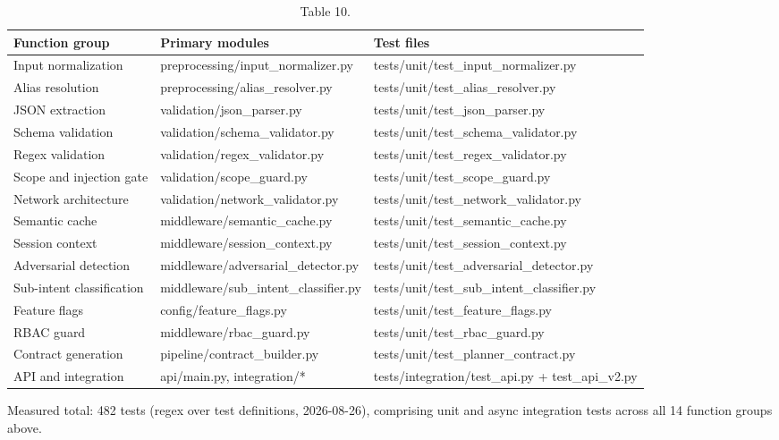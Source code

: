 \documentclass[10pt,journal,onecolumn]{IEEEtran}
\begin{document}
\begin{table}[h]
\caption{Table 10.}
\label{tab:t10}
\begin{tabularx}{\columnwidth}{l >{\raggedright\arraybackslash}X >{\raggedright\arraybackslash}X}
\toprule
\textbf{Function group} & \textbf{Primary modules} & \textbf{Test files}\\
\midrule
Input normalization & preprocessing/input\_normalizer.py & tests/unit/test\_input\_normalizer.py\\
Alias resolution & preprocessing/alias\_resolver.py & tests/unit/test\_alias\_resolver.py\\
JSON extraction & validation/json\_parser.py & tests/unit/test\_json\_parser.py\\
Schema validation & validation/schema\_validator.py & tests/unit/test\_schema\_validator.py\\
Regex validation & validation/regex\_validator.py & tests/unit/test\_regex\_validator.py\\
Scope and injection gate & validation/scope\_guard.py & tests/unit/test\_scope\_guard.py\\
Network architecture & validation/network\_validator.py & tests/unit/test\_network\_validator.py\\
Semantic cache & middleware/semantic\_cache.py & tests/unit/test\_semantic\_cache.py\\
Session context & middleware/session\_context.py & tests/unit/test\_session\_context.py\\
Adversarial detection & middleware/adversarial\_detector.py & tests/unit/test\_adversarial\_detector.py\\
Sub-intent classification & middleware/sub\_intent\_classifier.py & tests/unit/test\_sub\_intent\_classifier.py\\
Feature flags & config/feature\_flags.py & tests/unit/test\_feature\_flags.py\\
RBAC guard & middleware/rbac\_guard.py & tests/unit/test\_rbac\_guard.py\\
Contract generation & pipeline/contract\_builder.py & tests/unit/test\_planner\_contract.py\\
API and integration & api/main.py, integration/* & tests/integration/test\_api.py + test\_api\_v2.py\\
\bottomrule
\end{tabularx}
\end{table}

Measured total: 482 tests (regex over test definitions, 2026-08-26), comprising unit and async integration tests across all 14 function groups above.
\end{document}
